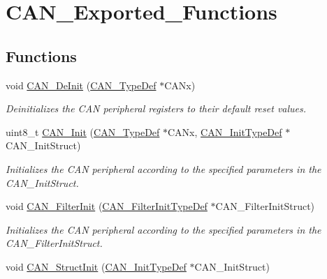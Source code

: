 \hypertarget{group___c_a_n___exported___functions}{}\section{C\+A\+N\+\_\+\+Exported\+\_\+\+Functions}
\label{group___c_a_n___exported___functions}
\subsection*{Functions}
\begin{DoxyCompactItemize}
\item 
void \mbox{\hyperlink{group___c_a_n___exported___functions_ga002b74cd69574a14b17ad445090245cd}{C\+A\+N\+\_\+\+De\+Init}} (\mbox{\hyperlink{struct_c_a_n___type_def}{C\+A\+N\+\_\+\+Type\+Def}} $\ast$C\+A\+Nx)
\begin{DoxyCompactList}\small\item\em Deinitializes the C\+AN peripheral registers to their default reset values. \end{DoxyCompactList}\item 
uint8\+\_\+t \mbox{\hyperlink{group___c_a_n___exported___functions_ga9023c35a9ab931ad4513fc5d19b4bd6c}{C\+A\+N\+\_\+\+Init}} (\mbox{\hyperlink{struct_c_a_n___type_def}{C\+A\+N\+\_\+\+Type\+Def}} $\ast$C\+A\+Nx, \mbox{\hyperlink{struct_c_a_n___init_type_def}{C\+A\+N\+\_\+\+Init\+Type\+Def}} $\ast$C\+A\+N\+\_\+\+Init\+Struct)
\begin{DoxyCompactList}\small\item\em Initializes the C\+AN peripheral according to the specified parameters in the C\+A\+N\+\_\+\+Init\+Struct. \end{DoxyCompactList}\item 
void \mbox{\hyperlink{group___c_a_n___exported___functions_ga39476830280340363c51041be6b12647}{C\+A\+N\+\_\+\+Filter\+Init}} (\mbox{\hyperlink{struct_c_a_n___filter_init_type_def}{C\+A\+N\+\_\+\+Filter\+Init\+Type\+Def}} $\ast$C\+A\+N\+\_\+\+Filter\+Init\+Struct)
\begin{DoxyCompactList}\small\item\em Initializes the C\+AN peripheral according to the specified parameters in the C\+A\+N\+\_\+\+Filter\+Init\+Struct. \end{DoxyCompactList}\item 
void \mbox{\hyperlink{group___c_a_n___exported___functions_gad77ad810868ed111755fc9e8ae0c7646}{C\+A\+N\+\_\+\+Struct\+Init}} (\mbox{\hyperlink{struct_c_a_n___init_type_def}{C\+A\+N\+\_\+\+Init\+Type\+Def}} $\ast$C\+A\+N\+\_\+\+Init\+Struct)

\end{DoxyCompactItemize}
